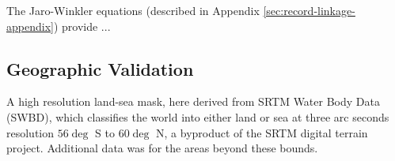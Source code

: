 

The Jaro-Winkler equations (described in Appendix \ref{sec:record-linkage-appendix}) provide ...


\subsection{Geographic Validation}


A high resolution land-sea mask, here derived from SRTM Water Body Data (SWBD), which classifies the world into either land or sea at three arc seconds resolution $56\deg$ S to $60\deg$ N, a byproduct of the SRTM digital terrain project. Additional data was for the areas beyond these bounds.
